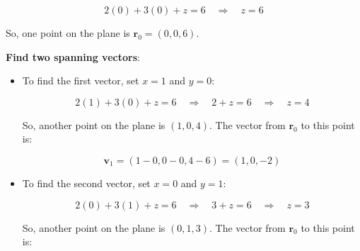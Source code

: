 \documentclass{report}
\begin{document}
\begin{itemize}
\begin{itemize}
                    \[
                        2(0) + 3(0) + z = 6 \quad \Rightarrow \quad z = 6
                    \]

                    So, one point on the plane is \(\mathbf{r}_0 = (0, 0, 6)\).
            \end{itemize}
            \textbf{Find two spanning vectors}:
            \begin{itemize}
                \item To find the first vector, set \(x = 1\) and \(y = 0\):

                    \[
                        2(1) + 3(0) + z = 6 \quad \Rightarrow \quad 2 + z = 6 \quad \Rightarrow \quad z = 4
                    \]

                    So, another point on the plane is \((1, 0, 4)\). The vector from \(\mathbf{r}_0\) to this point is:

                    \[
                        \mathbf{v}_1 = (1 - 0, 0 - 0, 4 - 6) = (1, 0, -2)
                    \]

                \item To find the second vector, set \(x = 0\) and \(y = 1\):

                    \[
                        2(0) + 3(1) + z = 6 \quad \Rightarrow \quad 3 + z = 6 \quad \Rightarrow \quad z = 3
                    \]

                    So, another point on the plane is \((0, 1, 3)\). The vector from \(\mathbf{r}_0\) to this point is:


\end{itemize}
\end{itemize}
\end{document}

